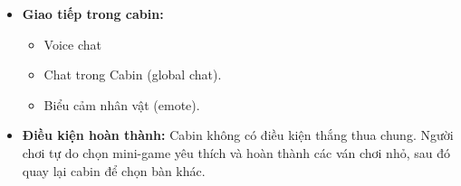 \begin{itemize}
    \item \textbf{Giao tiếp trong cabin:}  
    \begin{itemize}
        \item Voice chat
        \item Chat trong Cabin (global chat).
        \item Biểu cảm nhân vật (emote).
    \end{itemize}

    \item \textbf{Điều kiện hoàn thành:}  
    Cabin không có điều kiện thắng thua chung. Người chơi tự do chọn mini-game yêu thích và hoàn thành các ván chơi nhỏ, sau đó quay lại cabin để chọn bàn khác.
\end{itemize}